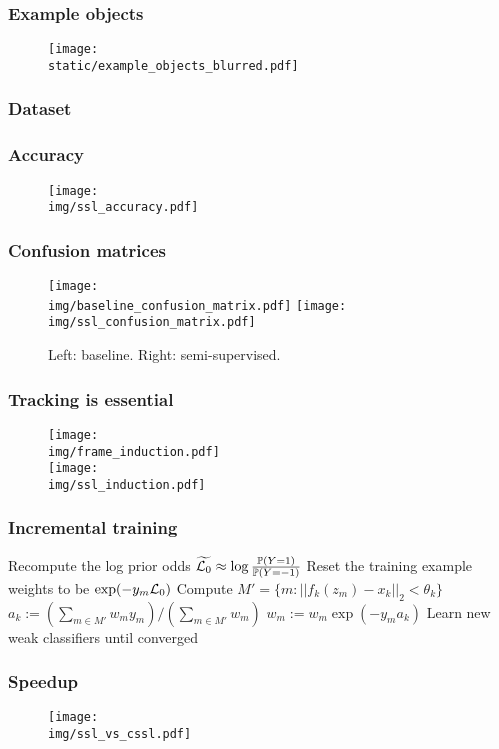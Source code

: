 \documentclass{beamer}
\newcommand{\static}{../latex/static_img}
\newcommand{\img}{../latex/img}
\newcommand{\logprior}{\log \frac{\Pr(Y = 1)}{\Pr(Y = -1)}}
\begin{document}
\begin{frame}
  \frametitle{Example objects}
  \begin{figure}
  \centering
  \texttt{[image: \\static/example\_objects\_blurred.pdf]}
  \label{fig:example_objs}
\end{figure}
\end{frame}

\begin{frame}
  \frametitle{Dataset}
  \begin{table}
    \centering
    \tiny{
    
    }
    \label{tab:stc_tab}
  \end{table}
\end{frame}


\begin{frame}
  \frametitle{Accuracy}
\begin{figure}
  \centering
  \texttt{[image: \\img/ssl\_accuracy.pdf]}
  \label{fig:core}
\end{figure}
\end{frame}

\begin{frame}
  \frametitle{Confusion matrices}
\begin{figure}
  \caption{\tiny{Left: baseline. Right: semi-supervised.}}
  \centering
  \texttt{[image: \\img/baseline\_confusion\_matrix.pdf]}
  \texttt{[image: \\img/ssl\_confusion\_matrix.pdf]}
  \label{fig:conf}
\end{figure}
\end{frame}

\begin{frame}
  \frametitle{Tracking is essential}
\begin{figure}
  \centering
  \texttt{[image: \\img/frame\_induction.pdf]} \\
  \vspace{0.1in}
  \texttt{[image: \\img/ssl\_induction.pdf]}
  \label{fig:tracking_vs_not}
\end{figure}
\end{frame}

\begin{frame}
  \frametitle{Incremental training}
  
  \begin{algorithm}[H]
    \label{alg:rr}
  \begin{algorithmic}
    \tiny{
    \STATE Recompute the log prior odds $\widetilde{\L_0} \approx \logprior$
    \STATE Reset the training example weights to be $\exp(-y_m \mathcal{L}_0)$
    \STATE Compute $M' = \{m : ||f_k(z_m) - x_k||_2 < \theta_k\}$
    \STATE $a_k := \left( \sum_{m \in M'} w_m y_m \right) /  \left( \sum_{m \in M'} w_m \right)$
    \STATE $w_m := w_m \exp(-y_m a_k)$
    \ENDFOR
    \ENDFOR
    \STATE Learn new weak classifiers until converged
    }
  \end{algorithmic}
\end{algorithm}
\end{frame}

\begin{frame}
  \frametitle{Speedup}
\begin{figure}
  \centering
  \texttt{[image: \\img/ssl\_vs\_cssl.pdf]}
  \label{fig:cssl}
\end{figure}
\end{frame}
\end{document}
